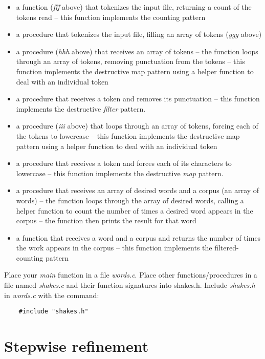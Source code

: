 \documentclass[12pt]{article}
\begin{document}
\begin{itemize}
\item
    a function ({\it fff} above)
    that tokenizes the input file, returning a count of the
    tokens read -- this function implements the counting pattern
\item
    a procedure that tokenizes the input file, filling an array of tokens
    ({\it ggg} above)
\item
    a procedure ({\it hhh} above)
    that receives an array of tokens -- the
    function loops through an array of tokens, removing punctuation
    from the tokens  -- this function
    implements the destructive map pattern using a helper function to deal 
    with an individual token
\item
    a procedure that receives a token and removes its punctuation --
    this function implements
    the destructive {\it filter} pattern.
\item
    a procedure ({\it iii} above)
    that loops through an array of tokens, forcing each
    of the tokens to lowercase --
    this function
    implements the destructive map pattern using a helper function to deal
    with an individual token
\item
    a procedure that receives a token and forces each of its characters
    to lowercase --
    this function implements the destructive {\it map} pattern.
\item
    a procedure that receives an array of desired words
    and a corpus (an array of
    words) -- the function loops through the array of desired words, calling
    a helper function to count the number of times a desired word appears
    in the corpus -- the function then prints the result for that word
\item
    a function that receives a word and a corpus and returns the number
    of times the work appears in the corpus -- this function implements
    the filtered-counting pattern
\end{itemize}

Place your {\it main} function in a 
file {\it words.c}. Place other functions/procedures
in a file named
{\it shakes.c}  and their function signatures into shakes.h.
Include {\it shakes.h} in {\it words.c}
with the command:

\begin{verbatim}
    #include "shakes.h"
\end{verbatim}

\section*{Stepwise refinement}
\end{document}
